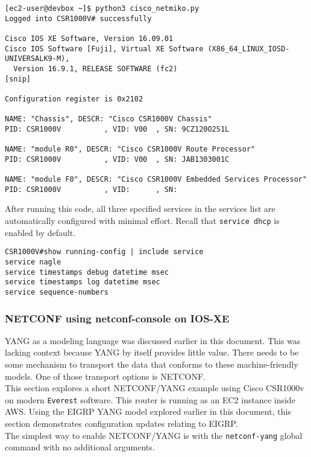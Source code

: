 \begin{verbatim}
[ec2-user@devbox ~]$ python3 cisco_netmiko.py
Logged into CSR1000V# successfully

Cisco IOS XE Software, Version 16.09.01
Cisco IOS Software [Fuji], Virtual XE Software (X86_64_LINUX_IOSD-UNIVERSALK9-M),
  Version 16.9.1, RELEASE SOFTWARE (fc2)
[snip]

Configuration register is 0x2102

NAME: "Chassis", DESCR: "Cisco CSR1000V Chassis"
PID: CSR1000V          , VID: V00  , SN: 9CZ120O2S1L

NAME: "module R0", DESCR: "Cisco CSR1000V Route Processor"
PID: CSR1000V          , VID: V00  , SN: JAB1303001C

NAME: "module F0", DESCR: "Cisco CSR1000V Embedded Services Processor"
PID: CSR1000V          , VID:      , SN:
\end{verbatim}

After running this code, all three specified services in the services list are
automatically configured with minimal effort. Recall that \verb|service dhcp|
is enabled by default.

\begin{verbatim}
CSR1000V#show running-config | include service
service nagle
service timestamps debug datetime msec
service timestamps log datetime msec
service sequence-numbers
\end{verbatim}

\subsubsection{NETCONF using netconf-console on IOS-XE}
YANG as a modeling language was discussed earlier in this document. This was
lacking context because YANG by itself provides little value. There needs to
be some mechanism to transport the data that conforms to these
machine-friendly models. One of those transport options is NETCONF. \\

This section explores a short NETCONF/YANG example using Cisco CSR1000v on
modern \verb|Everest| software. This router is running as an EC2 instance inside
AWS. Using the EIGRP YANG model explored earlier in this document, this
section demonstrates configuration updates relating to EIGRP. \\

The simplest way to enable NETCONF/YANG is with the \verb|netconf-yang| global
command with no additional arguments.

